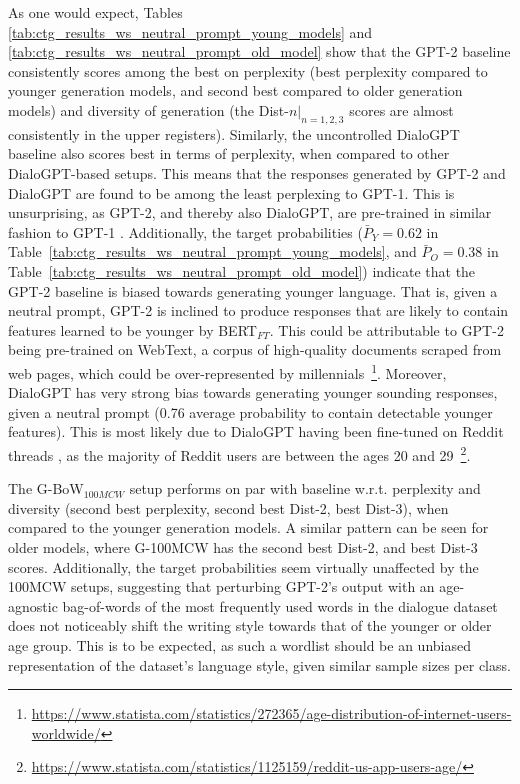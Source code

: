 As one would expect, Tables \ref{tab:ctg_results_ws_neutral_prompt_young_models} and \ref{tab:ctg_results_ws_neutral_prompt_old_model} show that the GPT-2 baseline consistently scores among the best on perplexity (best perplexity compared to younger generation models, and second best compared to older generation models) and diversity of generation (the Dist-$n |_{n = 1,2,3}$ scores are almost consistently in the upper registers). Similarly, the uncontrolled DialoGPT baseline also scores best in terms of perplexity, when compared to other DialoGPT-based setups. This means that the responses generated by GPT-2 and DialoGPT are found to be among the least perplexing to GPT-1. This is unsurprising, as GPT-2, and thereby also DialoGPT, are pre-trained in similar fashion to GPT-1 \citep{radford2018improving, radford2019language, zhang2019dialogpt}. Additionally, the target probabilities ($\bar{P}_Y = 0.62$ in Table~\ref{tab:ctg_results_ws_neutral_prompt_young_models}, and $\bar{P}_O = 0.38$ in Table~\ref{tab:ctg_results_ws_neutral_prompt_old_model}) indicate that the GPT-2 baseline is biased towards generating younger language. That is, given a neutral prompt, GPT-2 is inclined to produce responses that are likely to contain features learned to be younger by BERT$_{FT}$. This could be attributable to GPT-2 being pre-trained on WebText, a corpus of high-quality documents scraped from web pages, which could be over-represented by millennials~\footnote{\url{https://www.statista.com/statistics/272365/age-distribution-of-internet-users-worldwide/}}. Moreover, DialoGPT has very strong bias towards generating younger sounding responses, given a neutral prompt (0.76 average probability to contain detectable younger features). This is most likely due to DialoGPT having been fine-tuned on Reddit threads \citep{zhang2019dialogpt}, as the majority of Reddit users are between the ages 20 and 29~\footnote{\url{https://www.statista.com/statistics/1125159/reddit-us-app-users-age/}}.

The G-BoW$_{100MCW}$ setup performs on par with baseline w.r.t. perplexity and diversity (second best perplexity, second best Dist-2, best Dist-3), when compared to the younger generation models. A similar pattern can be seen for older models, where G-100MCW has the second best Dist-2, and best Dist-3 scores. Additionally, the target probabilities seem virtually unaffected by the 100MCW setups, suggesting that perturbing GPT-2's output with an age-agnostic bag-of-words of the most frequently used words in the dialogue dataset does not noticeably shift the writing style towards that of the younger or older age group. This is to be expected, as such a wordlist should be an unbiased representation of the dataset's language style, given similar sample sizes per class.

